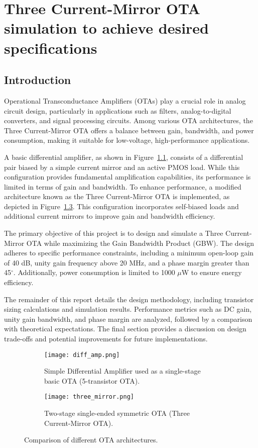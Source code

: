 \chapter{Three Current-Mirror OTA simulation to achieve desired specifications}
\label{ch:chap1}

\section{Introduction}
Operational Transconductance Amplifiers (OTAs) play a crucial role in analog circuit design, particularly in applications such as filters, analog-to-digital converters, and signal processing circuits. Among various OTA architectures, the Three Current-Mirror OTA offers a balance between gain, bandwidth, and power consumption, making it suitable for low-voltage, high-performance applications.

A basic differential amplifier, as shown in Figure~\ref{fig:diff_amp}, consists of a differential pair biased by a simple current mirror and an active PMOS load. While this configuration provides fundamental amplification capabilities, its performance is limited in terms of gain and bandwidth. To enhance performance, a modified architecture known as the Three Current-Mirror OTA is implemented, as depicted in Figure~\ref{fig:three_mirror}. This configuration incorporates self-biased loads and additional current mirrors to improve gain and bandwidth efficiency.

The primary objective of this project is to design and simulate a Three Current-Mirror OTA while maximizing the Gain Bandwidth Product (GBW). The design adheres to specific performance constraints, including a minimum open-loop gain of 40 dB, unity gain frequency above 20 MHz, and a phase margin greater than 45$^\circ$. Additionally, power consumption is limited to 1000 $\mu$W to ensure energy efficiency.

The remainder of this report details the design methodology, including transistor sizing calculations and simulation results. Performance metrics such as DC gain, unity gain bandwidth, and phase margin are analyzed, followed by a comparison with theoretical expectations. The final section provides a discussion on design trade-offs and potential improvements for future implementations.

\begin{figure}[h]
\centering
\begin{subfigure}[b]{0.45\textwidth}
\centering
\texttt{[image: diff\_amp.png]}
\caption{Simple Differential Amplifier used as a single-stage basic OTA (5-transistor OTA).}
\label{fig:diff_amp}
\end{subfigure}
\hfill
\begin{subfigure}[b]{0.45\textwidth}
\centering
\texttt{[image: three\_mirror.png]}
\caption{Two-stage single-ended symmetric OTA (Three Current-Mirror OTA).}
\label{fig:three_mirror}
\end{subfigure}
\caption{Comparison of different OTA architectures.}
\end{figure}






